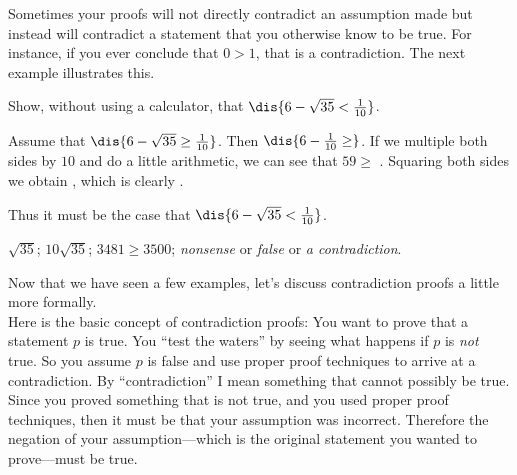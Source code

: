 Sometimes your proofs will not directly contradict an assumption made but instead
will contradict a statement that you otherwise know to be true.  For instance, if you ever conclude
that $0>1$, that is a contradiction. 
The next example illustrates this.

\newpage
\begin{fib}
Show, without using a calculator, that 
$\dis{6 - \sqrt{35} < \frac{1}{10}}$.
\begin{pf}Assume that  $\dis{6 - \sqrt{35} \geq \frac{1}{10}}$.
Then  $\dis{6 - \frac{1}{10}\geq}$.  
If we multiple both sides by $10$ and do a little
arithmetic, we can see that $59\geq$ . 
Squaring both sides we obtain ,
which is clearly .

\noindent
Thus it must be the case that $\dis{6 - \sqrt{35} < \frac{1}{10}}$.
\end{pf}
\begin{answer}
$ \sqrt{35}$; $10\sqrt{35}$; $3481 \geq 3500$; {\em nonsense} or {\em false} or {\em a contradiction}.
\end{answer}
\end{fib}

Now that we have seen a few examples, let's discuss contradiction proofs a little more formally.\\
Here is the basic concept of contradiction proofs:  You want to prove that a statement $p$ is true. 
You ``test the waters'' by seeing what happens if $p$  is {\em not} true.
So you assume $p$ is false and use proper proof techniques to arrive at a contradiction.
By ``contradiction'' I mean something that cannot possibly be true.  Since you proved something that
is not true, and you used proper proof techniques, then it must be that your assumption was incorrect.
Therefore the negation of your assumption---which is the original statement you wanted to prove---must
be true.

